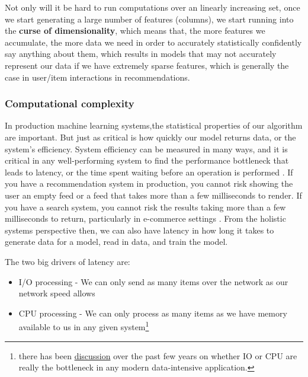 \documentclass[11pt, table]{diazessay} %
\begin{document}
\begin{sloppypar}
\begin{table}[H]
\end{table}

Not only will it be hard to run computations over an linearly increasing set, once we start generating a large number of features (columns), we start running into the \textbf{curse of dimensionality}, which means that, the more features we accumulate, the more data we need in order to accurately statistically confidently say anything about them, which results in models that may not accurately represent our data \citep{houle2010can} if we have extremely sparse features, which is generally the case in user/item interactions in recommendations.   

\subsubsection{Computational complexity}
 
In production machine learning systems,the statistical properties of our algorithm are important. But just as critical is how quickly our model returns data, or the system's efficiency. System efficiency can be measured in many ways, and it is critical in any well-performing system to find the performance bottleneck that leads to latency, or the time spent waiting before an operation is  performed \citep{gregg2014systems}. If you have a recommendation system in production, you cannot risk showing the user an empty feed or a feed that takes more than a few milliseconds to render. If you have a search system, you cannot risk the results taking more than a few milliseconds to return, particularly in e-commerce settings \cite{arapakis2014impact}.  From the holistic systems perspective then, we can also have latency in how long it takes to generate data for a model, read in data, and train the model.

The two big drivers of latency are:

\begin{itemize}
  \item I/O processing - We can only send as many items over the network as our network speed allows
  \item CPU processing - We can only process as many items as we have memory available to us in any given system\footnote{there has been \href{https://benhoyt.com/writings/io-is-no-longer-the-bottleneck/}{discussion} over the past few years on whether IO or CPU are really the bottleneck in any modern data-intensive application.}
\end{itemize}



\end{sloppypar}
\end{document}
